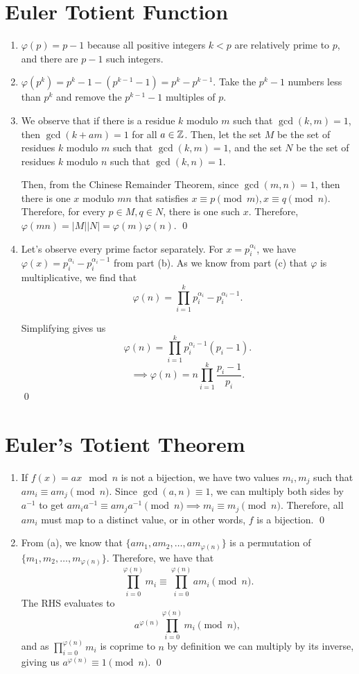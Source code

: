 \documentclass{article}
\begin{document}
	\section{Euler Totient Function}
	\begin{enumerate}[label=\alph*)]
		\item $\varphi(p) = p-1$ because all positive integers $k < p$ are relatively prime to $p$, and there are $p-1$ such integers.
		\item $\varphi(p^k) = p^k-1 - (p^{k-1} - 1) = p^k - p^{k-1}$. Take the $p^k-1$ numbers less than $p^k$ and remove the $p^{k-1}-1$ multiples of $p$.
		\item We observe that if there is a residue $k$ modulo $m$ such that $\gcd(k,m) = 1$, then $\gcd(k+am) = 1$ for all $a \in \mathbb Z$. Then, 
			let the set $M$ be the set of residues $k$ modulo $m$ such that $\gcd(k,m) = 1$, and the set $N$ be the set of residues $k$ modulo 
			$n$ such that $\gcd(k, n) = 1$. 

			Then, from the Chinese Remainder Theorem, since $\gcd(m, n) = 1$, then there is one $x$ modulo $mn$ that satisfies
			$x \equiv p \pmod m, x \equiv q \pmod n$. Therefore, for every $p \in M, q \in N$, there is one such $x$. Therefore, 
			$\varphi(mn) = |M| |N| = \varphi(m)\varphi(n)$. \qed
		\item Let's observe every prime factor separately. For $x = p_i^{\alpha_i}$, we have $\varphi(x) = p_i^{\alpha_i} - p_i^{\alpha_i-1}$
			from part (b). As we know from part (c) that $\varphi$ is multiplicative, we find that 
			\[\varphi(n) = \prod_{i=1}^{k} p_i^{\alpha_i} - p_i^{\alpha_i-1}.\]
			
			Simplifying gives us 
			\[\varphi(n) = \prod_{i=1}^{k} p_i^{\alpha_i-1}(p_i-1).\]
			\[\implies \varphi(n) = n\prod_{i=1}^{k} \frac{p_i-1}{p_i}.\] \qed
	\end{enumerate}

	\newpage
	\section{Euler's Totient Theorem}
	\begin{enumerate}[label=\alph*)]
		\item If $f(x) = ax \mod n$ is not a bijection, we have two values $m_i, m_j$ such that 
		$am_i \equiv am_j \pmod n$. Since $\gcd(a, n) \equiv 1$, we can multiply both sides 
		by $a^{-1}$ to get $am_ia^{-1} \equiv am_ja^{-1} \pmod n \implies m_i \equiv m_j \pmod n$.
		Therefore, all $am_i$ must map to a distinct value, or in other words, $f$ is a bijection. \qed
		\item From (a), we know that $\{am_1, am_2, \ldots, am_{\varphi(n)}\}$ is a permutation of 
		$\{m_1, m_2, \ldots, m_{\varphi(n)}\}$. Therefore, we have that
		\[\prod_{i=0}^{\varphi(n)}m_i \equiv \prod_{i=0}^{\varphi(n)}am_i \pmod{n}.\]
		The RHS evaluates to \[a^{\varphi(n)} \prod_{i=0}^{\varphi(n)}m_i \pmod{n},\] and as 
		$\prod_{i=0}^{\varphi(n)}m_i$ is coprime to $n$ by definition we can multiply by its inverse, giving us 
		$a^{\varphi(n)} \equiv 1 \pmod n$. \qed
	\end{enumerate}
\end{document}
